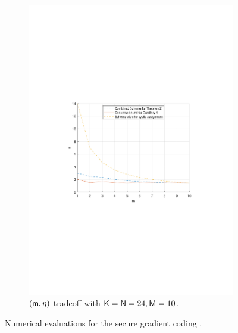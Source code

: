 \documentclass[conference,letterpaper]{IEEEtran}
\begin{document}
\begin{figure}[ht]
\begin{subfigure}[t]{0.5\textwidth}
        \includegraphics[scale=0.45]{m varies.pdf}
        \caption{\small $({\sf m},\eta)$ tradeoff with ${\sf K} = {\sf N}=24, {\sf M}=10$.}
        \label{fig:numerical 1c}
    \end{subfigure}
    \caption{\small Numerical evaluations for the secure gradient coding .}
    \label{fig:numerical 1}
\end{figure}
\end{document}
